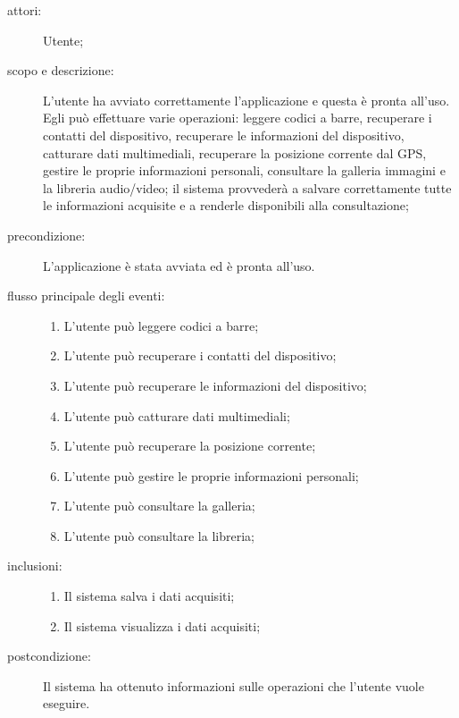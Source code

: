 \begin{description}
\item[attori:] Utente;
\item[scopo e descrizione:] L'utente ha avviato correttamente l'applicazione e questa è pronta all'uso. Egli può effettuare varie operazioni: leggere codici a barre, recuperare i contatti del dispositivo, recuperare le informazioni del dispositivo, catturare dati multimediali, recuperare la posizione corrente dal \ac{GPS}, gestire le proprie informazioni personali, consultare la galleria immagini e la libreria audio/video; il sistema provvederà a salvare correttamente tutte le informazioni acquisite e a renderle disponibili alla consultazione;
\item[precondizione:] L'applicazione è stata avviata ed è pronta all'uso.
\item[flusso principale degli eventi:] \hfill 
	\begin{enumerate}
	\item L'utente può leggere codici a barre;
	\item L'utente può recuperare i contatti del dispositivo;
	\item L'utente può recuperare le informazioni del dispositivo;
	\item L'utente può catturare dati multimediali;
	\item L'utente può recuperare la posizione corrente;
	\item L'utente può gestire le proprie informazioni personali;
	\item L'utente può consultare la galleria;
	\item L'utente può consultare la libreria;
	\end{enumerate}
\item[inclusioni:] \hfill 
	\begin{enumerate}
	\item Il sistema salva i dati acquisiti;
	\item Il sistema visualizza i dati acquisiti;
	\end{enumerate}
\item[postcondizione:] Il sistema ha ottenuto informazioni sulle operazioni che l'utente vuole eseguire.
\end{description}

